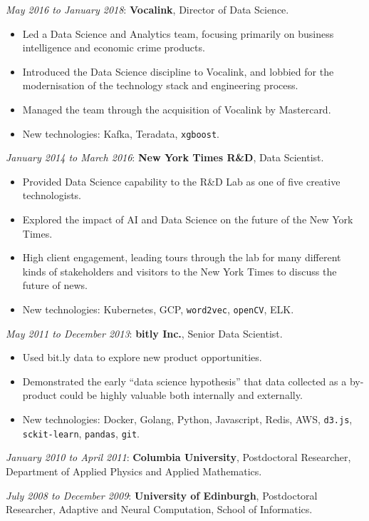 \documentclass[line, overlapped]{res}
\providecommand{\tightlist}{%
  \setlength{\itemsep}{0pt}\setlength{\parskip}{0pt}}
\begin{document}
\begin{resume}
  \emph{May 2016 to January 2018}: \textbf{Vocalink}, Director of Data Science.
  \begin{itemize}
  \tightlist
	\item Led a Data Science and Analytics team, focusing primarily on business intelligence and economic crime products. 
	\item Introduced the Data Science discipline to Vocalink, and lobbied for the modernisation of the technology stack and engineering process.
	\item Managed the team through the acquisition of Vocalink by Mastercard.
	\item New technologies: Kafka, Teradata, \texttt{xgboost}.
  \end{itemize}

  \emph{January 2014 to March 2016}: \textbf{New York Times R\&D}, Data
  Scientist.
  \begin{itemize}
  \tightlist
	  \item Provided Data Science capability to the R\&D Lab as one of five creative technologists. 
	\item Explored the impact of AI and Data Science on the future of the New York Times.
	\item High client engagement, leading tours through the lab for many different kinds of stakeholders and visitors to the New York Times to discuss the future of news.
	\item New technologies: Kubernetes, GCP, \texttt{word2vec}, \texttt{openCV}, ELK.
  \end{itemize}

  \emph{May 2011 to December 2013}: \textbf{bitly Inc.}, Senior Data Scientist.
  \begin{itemize}
  \tightlist
	\item Used bit.ly data to explore new product opportunities.
	\item Demonstrated the early ``data science hypothesis'' that data collected as a by-product could be highly valuable both internally and externally.
	\item New technologies: Docker, Golang, Python, Javascript, Redis, AWS, \texttt{d3.js}, \texttt{sckit-learn}, \texttt{pandas}, \texttt{git}.
  \end{itemize}

  \emph{January 2010 to April 2011}: \textbf{Columbia University},
  Postdoctoral Researcher, Department of Applied Physics and Applied
  Mathematics.

  \emph{July 2008 to December 2009}: \textbf{University of Edinburgh},
  Postdoctoral Researcher, Adaptive and Neural Computation, School of
  Informatics.


\end{resume}
\end{document}
